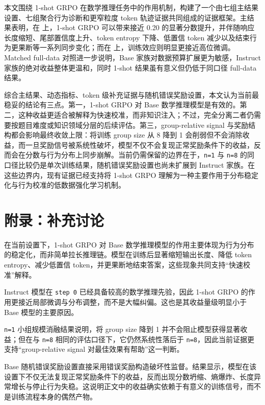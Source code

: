 \documentclass[12pt,a4paper]{ctexart}
\begin{document}
本文围绕 1-shot GRPO 在数学推理任务中的作用机制，构建了一个由七组主结果设置、七组聚合行为诊断和更窄粒度 token 轨迹证据共同组成的证据框架。主结果表明，在 \ModelBase{} 上，1-shot GRPO 可以带来接近 0.20 的显著分数提升，并伴随响应长度缩短、尾部置信度上升、token entropy 下降、低置信 token 减少以及结束行为更果断等一系列同步变化；而在 \ModelInstruct{} 上，训练效应则明显更接近高位微调。Matched full-data 对照进一步说明，Base 家族对数据预算扩展更为敏感，Instruct 家族的绝对收益整体更温和，同时 1-shot 结果虽有意义但仍低于同口径 full-data 结果。

综合主结果、动态指标、token 级补充证据与随机错误奖励设置，本文认为当前最稳妥的结论有三点。第一，1-shot GRPO 对 Base 数学推理模型是有效的。第二，这种收益更适合被解释为快速校准，而非知识注入；不过，完全分离二者仍需要按题目难度或知识领域分层的后续评估。第三，group-relative signal 与奖励结构都会影响最终收敛上限：将训练 group size 从 8 降到 1 会削弱但不会消除收益，而一旦奖励信号被系统性破坏，模型不仅不会复现正常奖励条件下的收益，反而会在分数与行为分布上同步崩解。当前仍需保留的边界在于，\texttt{n=1} 与 \texttt{n=8} 的同口径比较仍是单次训练结果，随机错误奖励设置也尚未扩展到 Instruct 家族。在这些边界内，现有证据已经支持将 1-shot GRPO 理解为一种主要作用于分布稳定化与行为校准的低数据强化学习机制。

\clearpage
\appendix

\section{附录：补充讨论}

在当前设置下，1-shot GRPO 对 Base 数学推理模型的作用主要体现为行为分布的稳定化，而非简单拉长推理链。模型在训练后显著缩短输出长度、降低 token entropy、减少低置信 token，并更果断地结束答案，这些现象共同支持“快速校准”解释。

Instruct 模型在 \texttt{step 0} 已经具备较高的数学推理先验，因此 1-shot GRPO 的作用更接近局部微调与分布调整，而不是大幅纠偏。这也是其收益量级明显小于 Base 模型的主要原因。

\texttt{n=1} 小组规模消融结果说明，将 group size 降到 1 并不会阻止模型获得显著收益；但在与 \texttt{n=8} 相同的评估口径下，它仍然系统性落后于 \texttt{n=8}，因此当前证据更支持“group-relative signal 对最佳效果有帮助”这一判断。

Base 随机错误奖励设置直接采用错误奖励构造破坏性监督。结果显示，模型在该设置下不仅无法复现正常奖励条件下的收益，反而出现分数坍缩、熵爆炸、长度异常增长与停止行为失稳。这说明正文中的收益确实依赖于有意义的训练信号，而不是训练流程本身的偶然产物。
\end{document}
